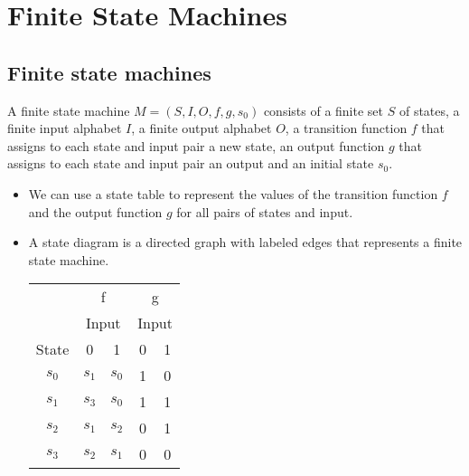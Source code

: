 \documentclass[../main-sheet.tex]{subfiles}
\begin{document}
\chapter{Finite State Machines}
\section{Finite state machines}
A finite state machine $ M=(S,I,O,f,g,s_0) $ consists of a finite set $ S $ of states, a finite input alphabet $ I $, a finite output alphabet $ O $, a transition function $ f $ that assigns to each state and input pair a new state, an output function $ g $ that assigns to each state and input pair an output and an initial state $ s_0 $.
\begin{itemize}
    \item We can use a state table to represent the values of the transition function $ f $ and the output function $ g $ for all pairs of states and input.
    \item A state diagram is a directed graph with labeled edges that represents a finite state machine.
          \begin{table}[H]
              \begin{minipage}[c]{0.38\linewidth}
                  \centering
                  \begin{tabular}{@{}ccccc@{}}
                      \toprule
                              & \multicolumn{2}{c}{f}     & \multicolumn{2}{c}{g}             \\ \cmidrule(l){2-5}
                              & \multicolumn{2}{c}{Input} & \multicolumn{2}{c}{Input}         \\ \cmidrule(l){2-5}
                      State   & 0                         & 1                         & 0 & 1 \\ \midrule
                      $ s_0 $ & $ s_1 $                   & $ s_0 $                   & 1 & 0 \\
                      $ s_1 $ & $ s_3 $                   & $ s_0 $                   & 1 & 1 \\
                      $ s_2 $ & $ s_1 $                   & $ s_2 $                   & 0 & 1 \\
                      $ s_3 $ & $ s_2 $                   & $ s_1 $                   & 0 & 0 \\ \bottomrule
                  \end{tabular}
              \end{minipage}\hfill
              \begin{minipage}[c]{0.58\linewidth}

\end{minipage}
\end{table}
\end{itemize}
\end{document}
